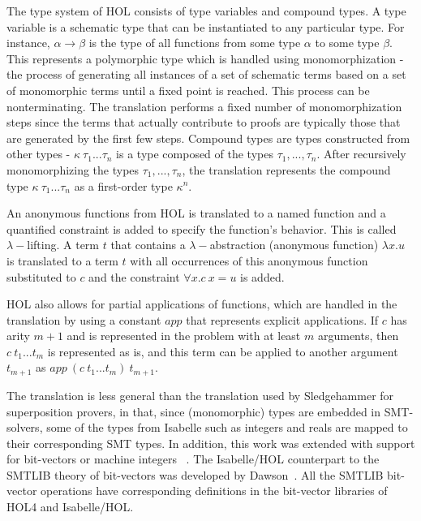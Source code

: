 \documentclass{article}
\begin{document}
		The type system of HOL consists 
		of type variables and compound types.
		A type variable is a schematic type that 
		can be instantiated to any particular type.
		For instance, $\alpha \to \beta$ is the type
		of all functions from some type $\alpha$ to
		some type $\beta$. This represents a 
		polymorphic type which is handled using 
		monomorphization - the process of generating
		all instances of a set of schematic terms based 
		on a set of monomorphic terms until a fixed point
		is reached. This process can be nonterminating. 
		The translation performs a fixed number of 
		monomorphization steps since the terms that 
		actually contribute to proofs are 
		typically those that are generated by the 
		first few steps. Compound types 
		are types constructed from other types - 
		$\kappa\ \tau_1 ... \tau_n$ is a type composed of 
		the types $\tau_1, ..., \tau_n$. After 
		recursively monomorphizing the types 
		$\tau_1, ..., \tau_n$, the translation 
		represents the compound type 
		$\kappa\ \tau_1 ... \tau_n$ as a first-order 
		type $\kappa^n$.
		
		An anonymous functions from HOL is translated 
		to a named function and a quantified constraint
		is added to specify the function's behavior.
		This is called $\lambda-$lifting.
		A term $t$ that contains a $\lambda-$abstraction
		(anonymous function) $\lambda x.u$ is translated 
		to a term $t$ with all occurrences of this 
		anonymous function substituted to $c$ and 
		the constraint $\forall x. c\ x = u$ is added.

		HOL also allows for partial applications of 
		functions, which are handled in the translation
		by using a constant $app$ that represents 
		explicit applications. If $c$ has arity 
		$m+1$ and is represented in the problem 
		with at least $m$ arguments, then 
		$c\ t_1 ... t_m$ is represented as is, 
		and this term can be applied to another 
		argument $t_{m+1}$ as 
		$app\ (c\ t_1 ... t_m)\ t_{m+1}$.
		
		The translation is less general than the 
		translation used by Sledgehammer for 
		superposition provers, in that, since (monomorphic) 
		types are embedded in SMT-solvers, some of the 
		types from Isabelle such as integers and reals 
		are mapped to their corresponding SMT types.
		In addition, this work was extended with 
		support for bit-vectors or machine integers
		~\cite{10.1007/978-3-642-25379-9_15}. The 
		Isabelle/HOL counterpart to the SMTLIB 
		theory of bit-vectors was developed by 
		Dawson~\cite{DAWSON200955}. All the SMTLIB
		bit-vector operations have corresponding 
		definitions in the bit-vector libraries of 
		HOL4 and Isabelle/HOL.
		
\end{document}
